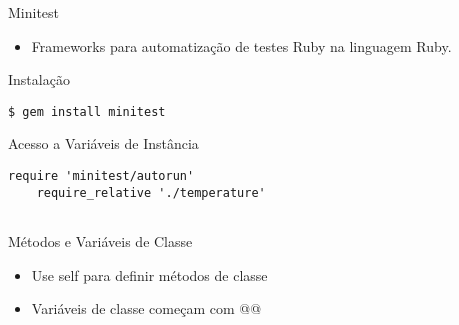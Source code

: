
\begin{frame}[fragile,t]{Minitest}
  \begin{itemize}
    \item Frameworks para automatização de testes Ruby na linguagem Ruby.
  \end{itemize}
\end{frame}


\begin{frame}[fragile,t]{Instalação}    
  \begin{lstlisting}[style=RubyInputStyle]
      $ gem install minitest
  \end{lstlisting}
\end{frame}

\begin{frame}[fragile,t]{Acesso a Variáveis de Instância}    
  \begin{lstlisting}[style=RubyInputStyle]
    require 'minitest/autorun'
    require_relative './temperature'
    
  \end{lstlisting}
\end{frame}

\begin{frame}{Métodos e Variáveis de Classe}    
  \begin{itemize}
    \item Use \alert{self} para definir métodos de classe
    \item Variáveis de classe começam com \alert{@@}
  \end{itemize}  
  
 
\end{frame}

